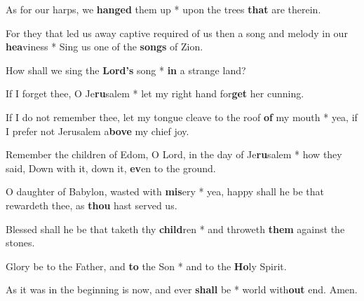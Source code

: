 \begin{multicols}{2}
	As for our harps, we \textbf{hanged} them up * upon the trees \textbf{that} are therein.
	
	For they that led us away captive required of us then a song and melody in our \textbf{hea}viness * Sing us one of the \textbf{songs} of Zion.
	
	How shall we sing the \textbf{Lord's} song * \textbf{in} a strange land?
	
	If I forget thee, O Je\textbf{ru}salem * let my right hand for\textbf{get} her cunning.
	
	If I do not remember thee, let my tongue cleave to the roof \textbf{of} my mouth * yea, if I prefer not Jerusalem a\textbf{bove} my chief joy.
	
	Remember the children of Edom, O Lord, in the day of Je\textbf{ru}salem * how they said, Down with it, down it, \textbf{ev}en to the ground.
	
	O daughter of Babylon, wasted with \textbf{mis}ery * yea, happy shall he be that rewardeth thee, as \textbf{thou} hast served us.
	
	Blessed shall he be that taketh thy \textbf{child}ren * and throweth \textbf{them} against the stones.
	
	Glory be to the Father, and \textbf{to} the Son * and to the \textbf{Ho}ly Spirit.
	
	As it was in the beginning is now, and ever \textbf{shall} be * world with\textbf{out} end. Amen.
\end{multicols}